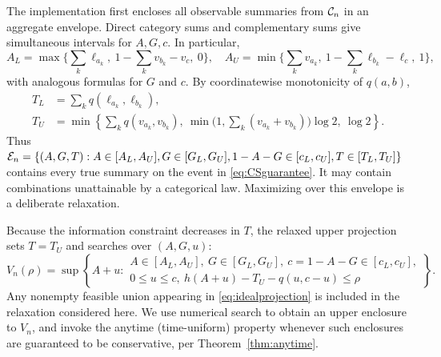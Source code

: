 The implementation first encloses all observable summaries from $\mathcal C_n$ in an aggregate envelope. Direct category sums and complementary sums give simultaneous intervals for $A,G,c$. In particular,
\begin{equation}\label{eq:aggregate}
 A_L=\max\Big\{\sum_k\ell_{a_k},\ 1-\sum_kv_{b_k}-v_c,\ 0\Big\},\quad
 A_U=\min\Big\{\sum_kv_{a_k},\ 1-\sum_k\ell_{b_k}-\ell_c,\ 1\Big\},
\end{equation}
with analogous formulas for $G$ and $c$. By coordinatewise monotonicity of $q(a,b)$,
\begin{align}
 T_L&=\sum_k q(\ell_{a_k},\ell_{b_k}),\label{eq:entropyenv}\\
 T_U&=\min\left\{\sum_kq(v_{a_k},v_{b_k}),\
 \min\big(1,\sum_k(v_{a_k}+v_{b_k})\big)\log2,\ \log2\right\}.\nonumber
\end{align}
Thus $\mathcal E_n=\{(A,G,T):A\in[A_L,A_U],G\in[G_L,G_U],1-A-G\in[c_L,c_U],T\in[T_L,T_U]\}$ contains every true summary on the event in \eqref{eq:CSguarantee}. It may contain combinations unattainable by a categorical law. Maximizing over this envelope is a deliberate relaxation.

Because the information constraint decreases in $T$, the relaxed upper projection sets $T=T_U$ and searches over $(A,G,u)$:
\begin{equation}\label{eq:relaxedprojection}
 V_n(\rho)=\sup\left\{A+u:
 \begin{array}{l} A\in[A_L,A_U],\ G\in[G_L,G_U],\ c=1-A-G\in[c_L,c_U],\\
 0\le u\le c,\ h(A+u)-T_U-q(u,c-u)\le\rho
 \end{array}\right\}.
\end{equation}
Any nonempty feasible union appearing in \eqref{eq:idealprojection} is included in the relaxation considered here. We use numerical search to obtain an upper enclosure to $V_n$, and invoke the anytime (time-uniform) property whenever such enclosures are guaranteed to be conservative, per Theorem~\ref{thm:anytime}.

